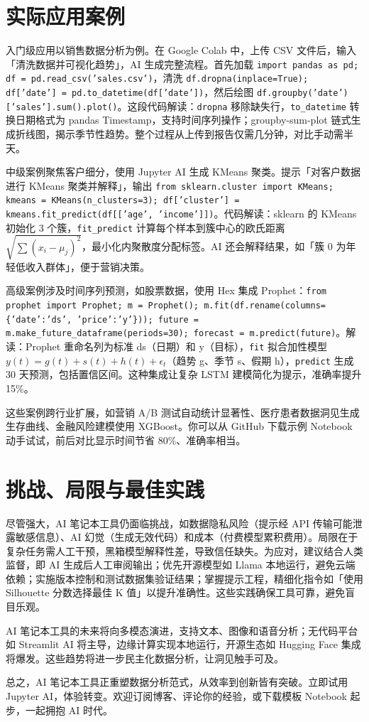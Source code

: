 \chapter{实际应用案例}
入门级应用以销售数据分析为例。在 Google Colab 中，上传 CSV 文件后，输入「清洗数据并可视化趋势」，AI 生成完整流程。首先加载 \texttt{import pandas as pd; df = pd.read\_{}csv('sales.csv')}，清洗 \texttt{df.dropna(inplace=True); df['date'] = pd.to\_{}datetime(df['date'])}，然后绘图 \texttt{df.groupby('date')['sales'].sum().plot()}。这段代码解读：\texttt{dropna} 移除缺失行，\texttt{to\_{}datetime} 转换日期格式为 pandas Timestamp，支持时间序列操作；groupby-sum-plot 链式生成折线图，揭示季节性趋势。整个过程从上传到报告仅需几分钟，对比手动需半天。\par
中级案例聚焦客户细分，使用 Jupyter AI 生成 KMeans 聚类。提示「对客户数据进行 KMeans 聚类并解释」，输出 \texttt{from sklearn.cluster import KMeans; kmeans = KMeans(n\_{}clusters=3); df['cluster'] = kmeans.fit\_{}predict(df[['age', 'income']])}。代码解读：sklearn 的 KMeans 初始化 3 个簇，\texttt{fit\_{}predict} 计算每个样本到簇中心的欧氏距离 $\sqrt{\sum (x_i - \mu_j)^2}$，最小化内聚散度分配标签。AI 还会解释结果，如「簇 0 为年轻低收入群体」，便于营销决策。\par
高级案例涉及时间序列预测，如股票数据，使用 Hex 集成 Prophet：\texttt{from prophet import Prophet; m = Prophet(); m.fit(df.rename(columns=\{{}'date':'ds', 'price':'y'\}{})); future = m.make\_{}future\_{}dataframe(periods=30); forecast = m.predict(future)}。解读：Prophet 重命名列为标准 ds（日期）和 y（目标），\texttt{fit} 拟合加性模型 $y(t) = g(t) + s(t) + h(t) + \epsilon_t$（趋势 g、季节 s、假期 h），\texttt{predict} 生成 30 天预测，包括置信区间。这种集成让复杂 LSTM 建模简化为提示，准确率提升 15\%{}。\par
这些案例跨行业扩展，如营销 A/B 测试自动统计显著性、医疗患者数据洞见生成生存曲线、金融风险建模使用 XGBoost。你可以从 GitHub 下载示例 Notebook 动手试试，前后对比显示时间节省 80\%{}、准确率相当。\par
\chapter{挑战、局限与最佳实践}
尽管强大，AI 笔记本工具仍面临挑战，如数据隐私风险（提示经 API 传输可能泄露敏感信息）、AI 幻觉（生成无效代码）和成本（付费模型累积费用）。局限在于复杂任务需人工干预，黑箱模型解释性差，导致信任缺失。为应对，建议结合人类监督，即 AI 生成后人工审阅输出；优先开源模型如 Llama 本地运行，避免云端依赖；实施版本控制和测试数据集验证结果；掌握提示工程，精细化指令如「使用 Silhouette 分数选择最佳 K 值」以提升准确性。这些实践确保工具可靠，避免盲目乐观。\par
AI 笔记本工具的未来将向多模态演进，支持文本、图像和语音分析；无代码平台如 Streamlit AI 将主导，边缘计算实现本地运行，开源生态如 Hugging Face 集成将爆发。这些趋势将进一步民主化数据分析，让洞见触手可及。\par
总之，AI 笔记本工具正重塑数据分析范式，从效率到创新皆有突破。立即试用 Jupyter AI，体验转变。欢迎订阅博客、评论你的经验，或下载模板 Notebook 起步，一起拥抱 AI 时代。\par
